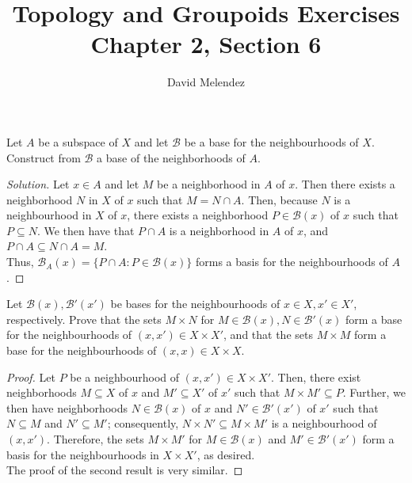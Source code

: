 \documentclass[12pt]{article}
\newenvironment{problem}[2][Problem]{\begin{trivlist}
\item[\hskip \labelsep {\bfseries #1}\hskip \labelsep {\bfseries #2.}]}{\end{trivlist}}
\newenvironment{solution}
  {\renewcommand\qedsymbol{$\blacksquare$}\begin{proof}[Solution]}
{\end{proof}}
\begin{document}
\title{Topology and Groupoids Exercises\\ \large Chapter 2, Section 6}
\author{David Melendez}
\maketitle

\begin{problem}{6.1}
  Let $A$ be a subspace of $X$ and let $\mathcal{B}$ be a base for the neighbourhoods of $X$.
  Construct from $\mathcal{B}$ a base of the neighborhoods of $A$.
\end{problem}
\begin{solution}
  Let $x\in A$ and let $M$ be a neighborhood in $A$ of $x$.
  Then there exists a neighborhood $N$ in $X$ of $x$ such that $M=N\cap A$.
  Then, because $N$ is a neighbourhood in $X$ of $x$, there exists a
  neighborhood $P\in\mathcal{B}(x)$ of $x$ such that $P\subseteq N$.
  We then have that $P\cap A$ is a neighborhood in $A$ of $x$, and
  $P\cap A\subseteq N\cap A = M$.\\
  \indent Thus, $\mathcal{B}_A(x) = \{P\cap A : P\in\mathcal{B}(x)\}$
  forms a basis for the neighbourhoods of $A$.
\end{solution}

\begin{problem}{6.2}
  Let $\mathcal{B}(x),\mathcal{B}'(x')$ be bases for the neighbourhoods of
  $x\in X,x'\in X'$, respectively.
  Prove that the sets $M\times N$ for $M\in\mathcal{B}(x),N\in\mathcal{B'}(x)$
  form a base for the neighbourhoods of $(x,x')\in X\times X'$, and that
  the sets $M\times M$ form a base for the neighbourhoods of 
  $(x,x)\in X\times X$.
\end{problem}
\begin{proof}
  Let $P$ be a neighbourhood of $(x,x')\in X\times X'$.
  Then, there exist neighborhoods $M\subseteq X$ of $x$ and $M'\subseteq X'$ of
  $x'$ such that $M\times M'\subseteq P$.
  Further, we then have neighborhoods $N\in\mathcal{B}(x)$ of $x$ and 
  $N'\in\mathcal{B}'(x')$ of $x'$ such that $N\subseteq M$ and 
  $N'\subseteq M'$; consequently, $N\times N'\subseteq M\times M'$ is
  a neighbourhood of $(x,x')$.
  Therefore, the sets $M\times M'$ for $M\in\mathcal{B}(x)$ and
  $M'\in\mathcal{B}'(x')$ form a basis for the neighbourhoods in $X\times X'$,
  as desired. \\
  \indent The proof of the second result is very similar.
\end{proof}
\end{document}
